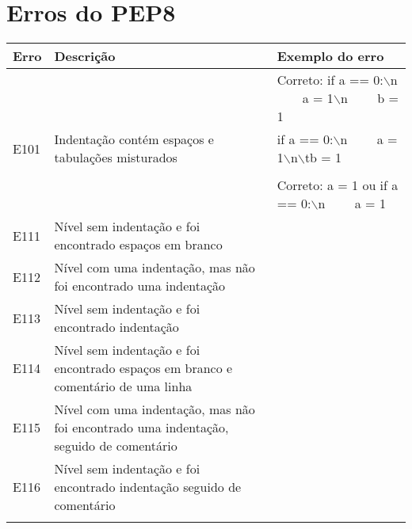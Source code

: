 \chapter{Erros do PEP8}

	\begin{table}
		\scriptsize
		\begin{tabularx}{\linewidth}{ |l|X|X| }
			\hline
			\textbf{Erro}
			& \textbf{Descrição}
			& \textbf{Exemplo do erro} \\
			\hline
			
			&
			& Correto: if a == 0:$\backslash$n \ \ \ \ a = 1$\backslash$n \ \ \ \ b = 1 \\
			\hline
			E101
			& Indentação contém espaços e tabulações misturados
			& if a == 0:$\backslash$n \ \ \ \ a = 1$\backslash$n$\backslash$tb = 1 \\
			\hline
			
			&
			&  \\
			\hline
			
			&
			& Correto: a = 1 ou if a == 0:$\backslash$n \ \ \ \ a = 1 \\
			\hline
			E111
			& Nível sem indentação e foi encontrado espaços em branco
			&  \\
			\hline
			E112
			& Nível com uma indentação, mas não foi encontrado uma indentação
			&  \\
			\hline
			E113
			& Nível sem indentação e foi encontrado indentação
			&  \\
			\hline
			E114
			& Nível sem indentação e foi encontrado espaços em branco e comentário de uma linha
			&  \\
			\hline
			E115
			& Nível com uma indentação, mas não foi encontrado uma indentação, seguido de comentário
			&  \\
			\hline
			E116
			& Nível sem indentação e foi encontrado indentação seguido de comentário
			&  \\
			\hline
			
			&  
			&  \\
			\hline
			

\end{tabularx}
\end{table}

